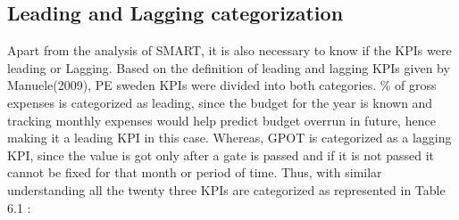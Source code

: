 \subsection{Leading and Lagging categorization}
Apart from the analysis of SMART, it is also necessary to know if the KPIs were leading or Lagging. Based on the definition of leading and lagging KPIs given by Manuele(2009), PE sweden  KPIs were divided into both categories. \% of gross expenses is categorized as leading, since the budget for the year is known and tracking monthly expenses would help predict budget overrun in future, hence making it a leading KPI in this case. Whereas, GPOT is categorized as a lagging KPI, since the value is got only after a gate is passed and if it is not passed it cannot be fixed for that month or period of time. Thus, with similar understanding all the twenty three KPIs are categorized as represented in Table 6.1 :
\begin{table}[h]
    \centering
    \captionsetup{justification=centering, margin=2cm}
    \caption{ Categorization of KPIs into Leading and Lagging }
   \label{tab:lead_Lag}
\end{table}

